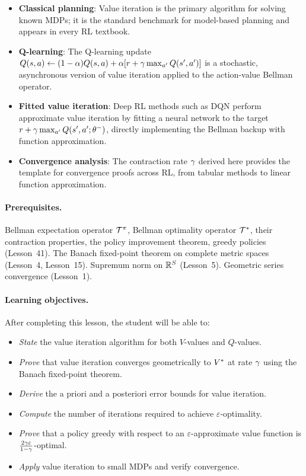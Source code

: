 \documentclass[11pt,a4paper]{article}
\begin{document}
\begin{rlconnection}[title={Why Value Iteration Matters for RL/ML}]
\begin{itemize}[nosep]
    \item \textbf{Classical planning}: Value iteration is the primary
    algorithm for solving known MDPs; it is the standard benchmark for
    model-based planning and appears in every RL textbook.
    \item \textbf{Q-learning}: The Q-learning update
    $Q(s,a) \leftarrow (1-\alpha)Q(s,a) + \alpha[r + \gamma
    \max_{a'} Q(s',a')]$ is a stochastic, asynchronous version of
    value iteration applied to the action-value Bellman operator.
    \item \textbf{Fitted value iteration}: Deep RL methods such as DQN
    perform approximate value iteration by fitting a neural network to
    the target $r + \gamma \max_{a'} Q(s',a';\theta^-)$, directly
    implementing the Bellman backup with function approximation.
    \item \textbf{Convergence analysis}: The contraction rate
    $\gamma$ derived here provides the template for convergence
    proofs across RL, from tabular methods to linear function
    approximation.
\end{itemize}
\end{rlconnection}

\paragraph{Prerequisites.}
Bellman expectation operator $\mathcal{T}^\pi$, Bellman optimality
operator $\mathcal{T}^*$, their contraction properties, the policy
improvement theorem, greedy policies (Lesson~41). The Banach
fixed-point theorem on complete metric spaces (Lesson~4, Lesson~15).
Supremum norm on $\mathbb{R}^S$ (Lesson~5). Geometric series convergence
(Lesson~1).

\paragraph{Learning objectives.}
After completing this lesson, the student will be able to:
\begin{itemize}
    \item \emph{State} the value iteration algorithm for both
    $V$-values and $Q$-values.
    \item \emph{Prove} that value iteration converges geometrically to
    $V^*$ at rate $\gamma$ using the Banach fixed-point theorem.
    \item \emph{Derive} the a priori and a posteriori error bounds for
    value iteration.
    \item \emph{Compute} the number of iterations required to achieve
    $\varepsilon$-optimality.
    \item \emph{Prove} that a policy greedy with respect to an
    $\varepsilon$-approximate value function is
    $\frac{2\gamma\varepsilon}{1-\gamma}$-optimal.
    \item \emph{Apply} value iteration to small MDPs and verify
    convergence.
\end{itemize}
\end{document}
